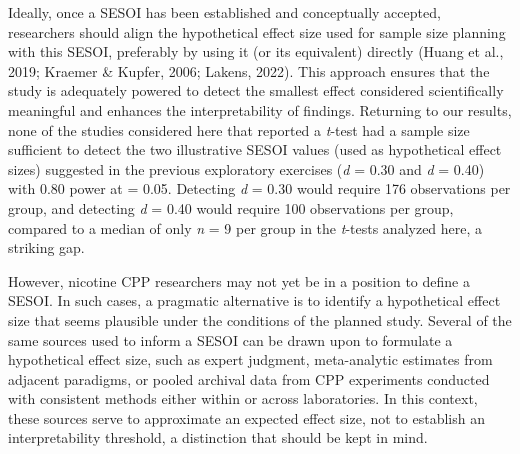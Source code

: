 \documentclass[authordate, meta]{jote-new-article}
\begin{document}
	Ideally, once a SESOI has been established and conceptually accepted, researchers should align the hypothetical effect size used for sample size planning with this SESOI, preferably by using it (or its equivalent) directly (Huang et al., 2019; Kraemer \& Kupfer, 2006; Lakens, 2022). This approach ensures that the study is adequately powered to detect the smallest effect considered scientifically meaningful and enhances the interpretability of findings. Returning to our results, none of the studies considered here that reported a \emph{t}-test had a sample size sufficient to detect the two illustrative SESOI values (used as hypothetical effect sizes) suggested in the previous exploratory exercises (\emph{d} = 0.30 and \emph{d} = 0.40) with 0.80 power at \alpha = 0.05. Detecting \emph{d} = 0.30 would require 176 observations per group, and detecting \emph{d} = 0.40 would require 100 observations per group, compared to a median of only \emph{n} = 9 per group in the \emph{t}-tests analyzed here, a striking gap.



	However, nicotine CPP researchers may not yet be in a position to define a SESOI. In such cases, a pragmatic alternative is to identify a hypothetical effect size that seems plausible under the conditions of the planned study. Several of the same sources used to inform a SESOI can be drawn upon to formulate a hypothetical effect size, such as expert judgment, meta-analytic estimates from adjacent paradigms, or pooled archival data from CPP experiments conducted with consistent methods either within or across laboratories. In this context, these sources serve to approximate an expected effect size, not to establish an interpretability threshold, a distinction that should be kept in mind.
\end{document}
